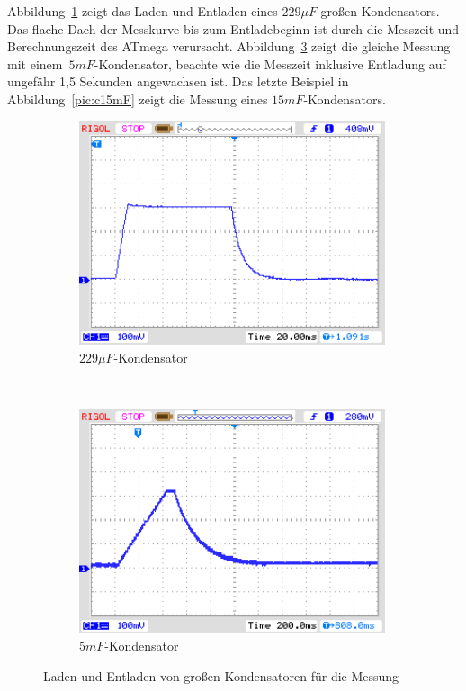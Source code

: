 Abbildung~\ref{pic:c229} zeigt das Laden und Entladen eines \(229\mu F\) großen Kondensators.
Das flache Dach der Messkurve bis zum Entladebeginn ist durch die Messzeit und Berechnungszeit des ATmega verursacht.
Abbildung~\ref{pic:c5mF} zeigt die gleiche Messung mit einem~\(5mF\)-Kondensator,
beachte wie die Messzeit inklusive Entladung auf ungefähr 1,5 Sekunden angewachsen ist.
Das letzte Beispiel in Abbildung~\ref{pic:c15mF} zeigt die Messung eines \(15mF\)-Kondensators.

\begin{figure}[H]
  \begin{subfigure}[b]{9cm}
    \centering
    \includegraphics[width=9cm]{../PNG/charge_229uF.png}
    \caption{\(229\mu F\)-Kondensator}
    \label{pic:c229}
  \end{subfigure}
  ~
  \begin{subfigure}[b]{9cm}
    \centering
    \includegraphics[width=9cm]{../PNG/charge_5mF.png}
    \caption{\(5mF\)-Kondensator}
    \label{pic:c5mF}
  \end{subfigure}
  \caption{Laden und Entladen von großen Kondensatoren für die Messung}
\end{figure}


